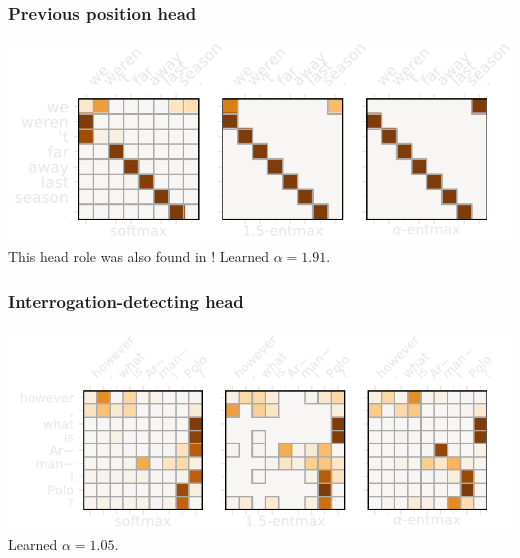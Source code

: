 \documentclass[xetex,aspectratio=169,xcolor,professionalfonts,hyperref]{beamer}
\begin{document}
\begin{frame}
    \frametitle{Previous position head}
    \vspace{-0.5cm}
    \begin{center}
        \includegraphics[width=0.9\columnwidth]{figures/head_prev_mybg}\\
        \fontsize{12pt}{15}\selectfont
        This head role was also found in \citet{specialized}! Learned {\color{myDarkYellow}$\alpha = 1.91$}.
    \end{center}

\end{frame}

\begin{frame}
    \frametitle{Interrogation-detecting head}
    \vspace{-0.5cm}
    \begin{center}
        \includegraphics[width=0.9\columnwidth]{figures/head_interro_mybg}\\
        \fontsize{12pt}{15}\selectfont
        Learned {\color{myDarkYellow}$\alpha = 1.05$}.
    \end{center}

\end{frame}
\end{document}
